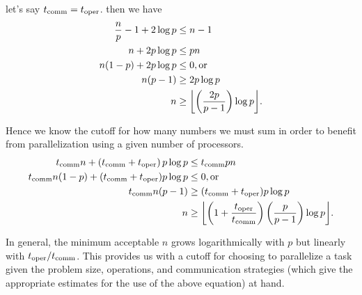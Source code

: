 let's say $t_\mathrm{comm} = t_\mathrm{oper}$. then we have
\begin{align*}
\frac{n}{p} - 1 + 2\log{p}  &\leq n-1                   \\
n + 2p\log{p}               &\leq pn                    \\
n(1 - p) + 2p\log{p}        &\leq 0 \mathrm{, or}       \\
n(p - 1)                    &\geq 2p\log{p}             \\
n                           &\geq \floor*{\left(\frac{2p}{p-1}\right)\log{p}}.
\end{align*}

Hence we know the cutoff for how many numbers we must sum in order to benefit
from parallelization using a given number of processors. 
\begin{align*}
\tcomm n + \left(\tcomm+\toper\right)p\log{p}   &\leq \tcomm pn                 \\
\tcomm n(1 - p) + (\tcomm+\toper)p\log{p}       &\leq 0 \mathrm{, or}           \\
\tcomm n(p - 1)                                 &\geq (\tcomm+\toper)p\log{p}   \\
n       &\geq \floor*{\left(1 + \frac{\toper}{\tcomm}\right)\left(\frac{p}{p-1}\right)\log{p}}.
\end{align*}

In general, the minimum acceptable $n$ grows logarithmically with $p$ but linearly
with $t_\mathrm{oper}/t_\mathrm{comm}$. This provides us with a cutoff for choosing to parallelize
a task given the problem size, operations, and communication strategies (which
give the appropriate estimates for the use of the above equation) at hand.

